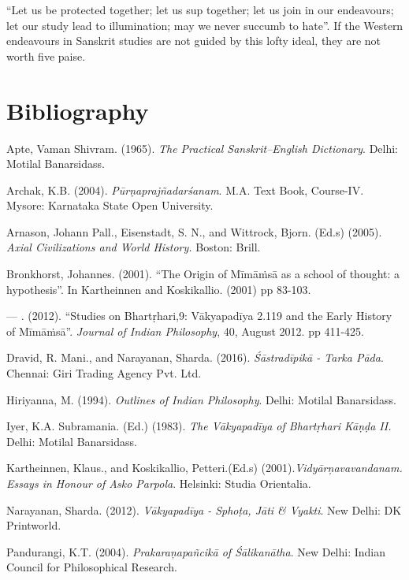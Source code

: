 “Let us be protected together; let us sup together; let us join in our endeavours; let our study lead to illumination; may we never succumb to hate”. If the Western endeavours in Sanskrit studies are not guided by this lofty ideal, they are not worth five paise.


\section*{Bibliography}

\begin{thebibliography}{99}
\itemsep=1pt
 Apte, Vaman Shivram. (1965). \textit{The Practical Sanskrit–English Dictionary}. Delhi: Motilal Banarsidass.

  Archak, K.B. (2004). \textit{Pūrṇaprajñadarśanam}. M.A. Text Book, Course-IV. Mysore: Karnataka State Open University.

  Arnason, Johann Pall., Eisenstadt, S. N., and Wittrock, Bjorn. (Ed.s) (2005). \textit{Axial Civilizations and World History.} Boston: Brill.

  Bronkhorst, Johannes. (2001). “The Origin of Mīmāṁsā as a school of thought: a hypothesis”. In Kartheinnen and Koskikallio. (2001) pp 83-103.

  — . (2012). “Studies on Bhartṛhari,9: Vākyapadīya 2.119 and the Early History of Mīmāṁsā”. \textit{Journal of Indian Philosophy}, 40, August 2012. pp 411-425.

  Dravid, R. Mani., and Narayanan, Sharda. (2016). \textit{Śāstradīpikā - Tarka Pāda}. Chennai: Giri Trading Agency Pvt. Ltd. 

  Hiriyanna, M. (1994). \textit{Outlines of Indian Philosophy}. Delhi: Motilal Banarsidass. 

  Iyer, K.A. Subramania. (Ed.) (1983). \textit{The Vākyapadīya of Bhartṛhari Kāṇḍa II.} Delhi: Motilal Banarsidass.

  Kartheinnen, Klaus., and Koskikallio, Petteri.(Ed.s) (2001).\textit{Vidyārņavavandanam. Essays in Honour of Asko Parpola}. Helsinki: Studia Orientalia.

  Narayanan, Sharda. (2012). \textit{Vākyapadīya - Sphoṭa, Jāti \& Vyakti}. New Delhi: DK Printworld. 

  Pandurangi, K.T. (2004). \textit{Prakaraņapañcikā of Śālikanātha}. New Delhi: Indian Council for Philosophical Research.


\end{thebibliography}
